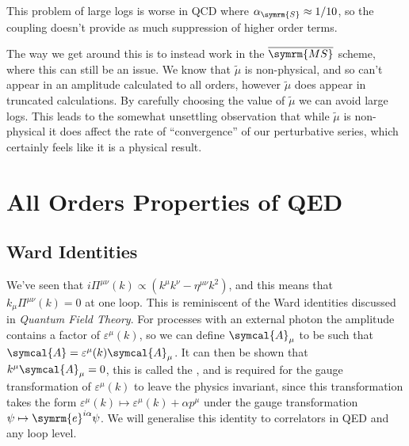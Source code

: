 \documentclass[fleqn]{NotesClass}
\newcommand*{\course}[1]{\textit{#1}}
\newcommand{\MSbar}{\ensuremath{\overline{\symrm{MS}}}}
\newcommand{\e}{\symrm{e}}
\newcommand{\amplitude}{\symcal{A}}
\newcommand{\minkowskiMetric}{\eta}
\newcommand{\strongCoupling}{\alpha_{\symrm{S}}}
\begin{document}
    This problem of large logs is worse in QCD where \(\strongCoupling \approx 1/10\), so the coupling doesn't provide as much suppression of higher order terms.
    
    The way we get around this is to instead work in the \MSbar{} scheme, where this can still be an issue.
    We know that \(\tilde{\mu}\) is non-physical, and so can't appear in an amplitude calculated to all orders, however \(\tilde{\mu}\) does appear in truncated calculations.
    By carefully choosing the value of \(\tilde{\mu}\) we can avoid large logs.
    This leads to the somewhat unsettling observation that while \(\tilde{\mu}\) is non-physical it does affect the rate of \enquote{convergence} of our perturbative series, which certainly feels like it is a physical result.
    
    \chapter{All Orders Properties of QED}
    \section{Ward Identities}
    We've seen that \(i\Pi^{\mu\nu}(k) \propto (k^\mu k^\nu - \minkowskiMetric^{\mu\nu}k^2)\), and this means that \(k_\mu \Pi^{\mu\nu}(k) = 0\) at one loop.
    This is reminiscent of the Ward identities discussed in \course{Quantum Field Theory}.
    For processes with an external photon the amplitude contains a factor of \(\varepsilon^\mu(k)\), so we can define \(\amplitude_\mu\) to be such that \(\amplitude = \varepsilon^\mu(k)\amplitude_\mu\).
    It can then be shown that \(k^\mu\amplitude_\mu = 0\), this is called the , and is required for the gauge transformation of \(\varepsilon^\mu(k)\) to leave the physics invariant, since this transformation takes the form \(\varepsilon^\mu(k) \mapsto \varepsilon^\mu(k) + \alpha p^\mu\) under the gauge transformation \(\psi \mapsto \e^{i\alpha}\psi\).
    We will generalise this identity to correlators in QED and any loop level.
    
    
\end{document}
